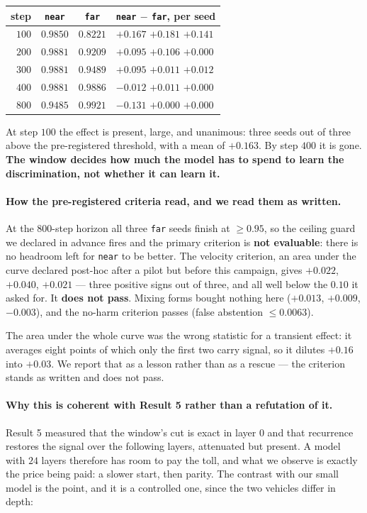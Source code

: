 \documentclass[11pt,a4paper]{article}
\begin{document}
\begin{center}
\begin{tabular}{rccl}
\toprule
step & \texttt{near} & \texttt{far} & \texttt{near} $-$ \texttt{far}, per seed \\
\midrule
$100$ & $0.9850$ & $0.8221$ & $\mathbf{+0.167}$ \quad $\mathbf{+0.181}$ \quad $\mathbf{+0.141}$ \\
$200$ & $0.9881$ & $0.9209$ & $+0.095$ \quad $+0.106$ \quad $+0.000$ \\
$300$ & $0.9881$ & $0.9489$ & $+0.095$ \quad $+0.011$ \quad $+0.012$ \\
$400$ & $0.9881$ & $0.9886$ & $-0.012$ \quad $+0.011$ \quad $+0.000$ \\
$800$ & $0.9485$ & $0.9921$ & $-0.131$ \quad $+0.000$ \quad $+0.000$ \\
\bottomrule
\end{tabular}
\end{center}

At step $100$ the effect is present, large, and unanimous: three seeds out of three above the
pre-registered threshold, with a mean of $+0.163$. By step $400$ it is gone. \textbf{The window
decides how much the model has to spend to learn the discrimination, not whether it can learn it.}

\paragraph{How the pre-registered criteria read, and we read them as written.} At the $800$-step
horizon all three \texttt{far} seeds finish at $\ge 0.95$, so the ceiling guard we declared in advance
fires and the primary criterion is \textbf{not evaluable}: there is no headroom left for \texttt{near}
to be better. The velocity criterion, an area under the curve declared post-hoc after a pilot but
before this campaign, gives $+0.022$, $+0.040$, $+0.021$ --- three positive signs out of three, and
all well below the $0.10$ it asked for. It \textbf{does not pass}. Mixing forms bought nothing here
($+0.013$, $+0.009$, $-0.003$), and the no-harm criterion passes (false abstention $\le 0.0063$).

The area under the whole curve was the wrong statistic for a transient effect: it averages eight
points of which only the first two carry signal, so it dilutes $+0.16$ into $+0.03$. We report that as
a lesson rather than as a rescue --- the criterion stands as written and does not pass.

\paragraph{Why this is coherent with Result 5 rather than a refutation of it.} Result 5 measured that
the window's cut is exact in layer $0$ and that recurrence restores the signal over the following
layers, attenuated but present. A model with $24$ layers therefore has room to pay the toll, and what
we observe is exactly the price being paid: a slower start, then parity. The contrast with our small
model is the point, and it is a controlled one, since the two vehicles differ in depth:
\end{document}
